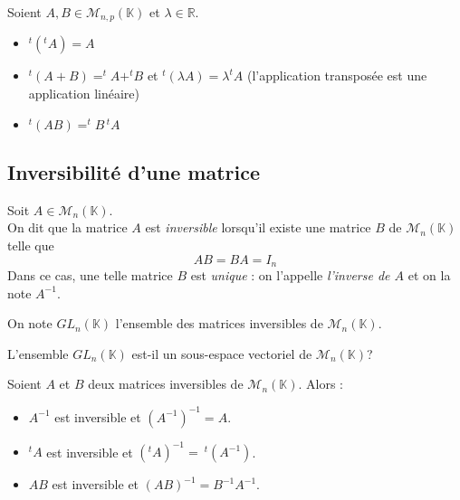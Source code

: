 \documentclass[a4paper,10pt]{report}
\begin{document}

\begin{Proposition}{}
Soient $A,B \in \mathcal{M}_{n,p}(\mathbb{K})$ et $\lambda \in \mathbb{R}$.
\begin{itemize}
\item 
$^t(^tA)= A$ 
\item 
$^t(A+B)=^tA + ^tB $ et $^t( \lambda A) = \lambda ^tA$ (l'application transposée est une application linéaire)
\item $^t(AB) =^tB \, ^tA$
\end{itemize}
\end{Proposition}


\subsection{Inversibilité d'une matrice}
\begin{TheoremeDefinition}{}
Soit $A \in \mathcal{M}_n(\mathbb{K})$.\\
On dit que la matrice $A$ est \emph{inversible} lorsqu'il existe une matrice $B$ de $\mathcal{M}_n(\mathbb{K})$ telle que
$$AB=BA=I_n$$
Dans ce cas, une telle matrice $B$ est \emph{unique} : on l'appelle \emph{l'inverse de $A$} et on la note $A^{-1}$.

On note $GL_{n}(\mathbb{K})$ l'ensemble des matrices inversibles de $\mathcal{M}_n(\mathbb{K})$.
\end{TheoremeDefinition}
%

\begin{ApplicationDirecte} L'ensemble $GL_{n}(\mathbb{K})$ est-il un sous-espace vectoriel de $\mathcal{M}_n(\mathbb{K})$?
\end{ApplicationDirecte}


\begin{Proposition}{}
Soient $A$ et $B$ deux matrices inversibles de $\mathcal{M}_n(\mathbb{K})$. Alors : 
\begin{itemize}
\item $A^{-1}$ est inversible et $(A^{-1})^{-1}=A$.
\item $^tA$ est inversible et $(^tA)^{-1} = \ ^t(A^{-1})$.
\item $AB$ est inversible et $(AB)^{-1}=B^{-1}A^{-1}$.
\end{itemize}
\end{Proposition}
\end{document}
